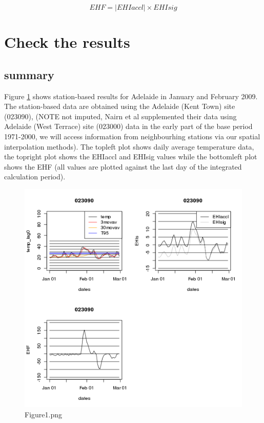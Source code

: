\documentclass[a4paper]{article}
\begin{document}
 $$EHF = | EHIaccl | \times EHI{sig}$$
 

\section{Check the results}


\subsection{summary}

Figure \ref{fig:Figure1.png} shows station-based results for Adelaide in January and February 2009. The station-based data are obtained using the Adelaide (Kent Town) site (023090), (NOTE not imputed, Nairn et al supplemented their data using Adelaide (West Terrace) site (023000) data in the early part of the base period 1971-2000, we will access information from neighbourhing stations via our spatial interpolation methods).
 The topleft plot shows daily average temperature data, the topright plot shows the EHI{accl} and EHI{sig} values while the bottomleft plot shows the EHF (all values are plotted against the last day of the integrated calculation period).
 

\begin{figure}[!h]
\centering
\includegraphics[width=\textwidth]{Figure1.png}
\caption{Figure1.png}
\label{fig:Figure1.png}
\end{figure}
\clearpage
\end{document}
